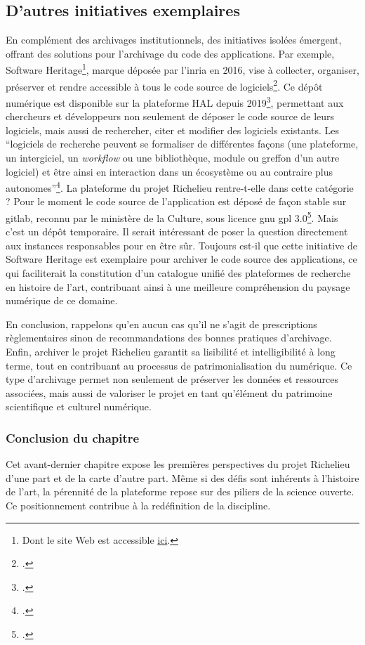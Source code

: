\subsection{D'autres initiatives exemplaires}

En complément des archivages institutionnels, des initiatives isolées émergent, offrant des solutions pour l'archivage du code des applications. Par exemple, Software Heritage\footnote{Dont le site Web est accessible \href{https://www.softwareheritage.org/}{ici}.}, marque déposée par l'\acrshort{inria} en 2016, vise à collecter, organiser, préserver et rendre accessible à tous le code source de logiciels\footcite{DICOSMO20442022}. Ce dépôt numérique est disponible sur la plateforme HAL depuis 2019\footcite{BADOLATOlogiciel2022}, permettant aux chercheurs et développeurs non seulement de déposer le code source de leurs logiciels, mais aussi de rechercher, citer et modifier des logiciels existants. Les \enquote{logiciels de recherche peuvent se formaliser de différentes façons (une plateforme, un intergiciel, un \textit{workflow} ou une bibliothèque, module ou greffon d’un autre logiciel) et être ainsi en interaction dans un écosystème ou au contraire plus autonomes}\footcite{BADOLATOlogiciel2022}. 
La plateforme du projet Richelieu rentre-t-elle dans cette catégorie ? Pour le moment le code source de l'application est déposé de façon stable sur \acrshort{gitlab}, reconnu par le ministère de la Culture, sous licence \acrshort{gnu} \acrshort{gpl} 3.0\footcite{INHAVers2023}. Mais c'est un dépôt temporaire. Il serait intéressant de poser la question directement aux instances responsables pour en être sûr. Toujours est-il que cette initiative de Software Heritage est exemplaire pour archiver le code source des applications, ce qui faciliterait la constitution d'un catalogue unifié des plateformes de recherche en histoire de l'art, contribuant ainsi à une meilleure compréhension du paysage numérique de ce domaine.

En conclusion, rappelons qu'en aucun cas qu'il ne s'agit de prescriptions règlementaires sinon de recommandations des bonnes pratiques d'archivage. Enfin, archiver le projet Richelieu garantit sa lisibilité et intelligibilité à long terme, tout en contribuant au processus de patrimonialisation du numérique. Ce type d'archivage permet non seulement de préserver les données et ressources associées, mais aussi de valoriser le projet en tant qu'élément du patrimoine scientifique et culturel numérique.


\subsubsection{Conclusion du chapitre}
Cet avant-dernier chapitre expose les premières perspectives du projet Richelieu d'une part et de la carte d'autre part. Même si des défis sont inhérents à l'histoire de l'art, la pérennité de la plateforme repose sur des piliers de la science ouverte. Ce positionnement contribue à la redéfinition de la discipline. 